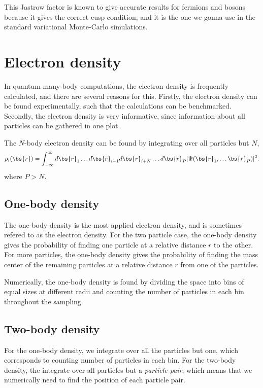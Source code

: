 This Jastrow factor is known to give accurate results for fermions and bosons because it gives the correct cusp condition, and it is the one we gonna use in the standard variational Monte-Carlo simulations.

\section{Electron density}
In quantum many-body computations, the electron density is frequently calculated, and there are several reasons for this. Firstly, the electron density can be found experimentally, such that the calculations can be benchmarked. Secondly, the electron density is very informative, since information about all particles can be gathered in one plot.

The $N$-body electron density can be found by integrating over all particles but $N$, 
\begin{equation}
\label{eq:electron_density}
\rho_i(\bs{r})=\int_{-\infty}^{\infty}d\bs{r}_1\hdots d\bs{r}_{i-1}d\bs{r}_{i+N}\hdots d\bs{r}_P |\Psi(\bs{r}_1,\hdots \bs{r}_P)|^2.
\end{equation}
where $P>N$.

\subsection{One-body density}
The one-body density is the most applied electron density, and is sometimes refered to as the electron density. For the two particle case, the one-body density gives the probability of finding one particle at a relative distance $r$ to the other. For more particles, the one-body density gives the probability of finding the mass center of the remaining particles at a relative distance $r$ from one of the particles.

Numerically, the one-body density is found by dividing the space into bins of equal sizes at different radii and counting the number of particles in each bin throughout the sampling. 



\subsection{Two-body density}
For the one-body density, we integrate over all the particles but one, which corresponds to counting number of particles in each bin. For the two-body density, the integrate over all particles but a \textit{particle pair}, which means that we numerically need to find the position of each particle pair. 




